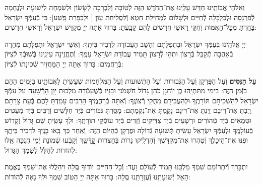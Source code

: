 \documentclass[twoside, openany, parskip=half, 11pt]{book}
\begin{document}
וֵאלֹהֵי אֲבוֹתֵֽינוּ חַדֵּשׁ עָלֵֽינוּ אֶת־הַחֹֽדֶשׁ הַזֶּה לְֿטוֹבָה וְֿלִבְרָכָה לְֿשָׂשׂוֹן וּלְשִׂמְחָה לִישׁוּעָה וּלְנֶחָמָה לְֿפַרְנָסָה וּלְכַלְכָּלָה לְֿחַיִּים וּלְשָׁלוֹם לִמְחִֽילַת חֵטְא וְֿלִסְלִיחַת עָוֹן [
וּלְכַפָּרַת פָּֽשַׁע]: כִּי בְֿעַמְּֿךָ יִשְׂרָאֵל בָּחַֽרְתָּ מִכׇּל־הָאֻמּוֹת וְֿחֻקֵּי רָאשֵׁי חֳדָשִׁים לָהֶם קָבָֽעְֿתָּ: בָּרוּךְ אַתָּה יְיָ מְֿקַדֵּשׁ יִשְׂרָאֵל וְֿרָאשֵׁי חֳדָשִׁים:

\nextpage
{}
יְיָ אֱלֹהֵֽינוּ בְּֿעַמְּֿךָ יִשְׂרָאֵל וּבִתְפִלָּתָם וְֿהָשֵׁב הָעֲבוֹדָה לִדְבִיר בֵּיתֶֽךָ: וְֿאִשֵּׁי יִשְׂרָאֵל וּתְפִלָּתָם מְֿהֵרָה בְּֿאַהֲבָה תְֿקַבֵּל בְּֿרָצוֹן וּתְהִי לְֿרָצוֹן תָּמִיד עֲבוֹדַת יִשְׂרָאֵל עַמֶּֽךָ: וְֿתֶחֱזֶֽינָה עֵינֵֽינוּ בְּֿשׁוּבְֿךָ לְֿצִיּוֹן בְּֿרַחֲמִים: בָּרוּךְ אַתָּה יְיָ הַמַּחֲזִיר שְֿׁכִינָתוֹ לְֿצִיּוֹן:

\modim

\enlargethispage{\baselineskip}

\begin{sometimes}

\textbf{עַל הַנִּסִּים}
וְֿעַל הַפֻּרְקָן וְֿעַל הַגְּֿבוּרוֹת וְֿעַל הַתְּֿשׁוּעוֹת וְֿעַל הַמִּלְחָמוֹת
שֶׁעָשִֽׂיתָ לַאֲבוֹתֵֽינוּ בַּיָּמִים הָהֵם בַּזְּֿמַן הַזֶּה:
בִּימֵי מַתִּתְיָֽהוּ בֶּן יוֹחָנָן כֹּהֵן גָּדוֹל חַשְׁמֹנַי וּבָנָיו כְּֿשֶׁעָמְֿדָה מַלְכוּת יָוָן הָרְֿשָׁעָה עַל עַמְּֿךָ יִשְׂרָאֵל לְֿהַשְׁכִּיחָם תּוֹרָתֶֽךָ וּלְהַעֲבִירָם מֵחֻקֵּי רְֿצוֹנֶֽךָ: וְֿאַתָּה בְּֿרַחֲמֶֽיךָ הָרַבִּים עָמַֽדְתָּ לָהֶם בְּֿעֵת צָרָתָם רַֽבְתָּ אֶת־רִיבָם דַּֽנְתָּ אֶת־דִּינָם נָקַֽמְתָּ אֶת־נִקְמָתָם: מָסַֽרְתָּ גִּבּוֹרִים בְּֿיַד חַלָּשִׁים וְֿרַבִּים בְּֿיַד מְֿעַטִּים וּטְמֵאִים בְּֿיַד טְֿהוֹרִים וּרְשָׁעִים בְּֿיַד צַדִּיקִים וְֿזֵדִים בְּֿיַד עוֹסְֿקֵי תוֹרָתֶֽךָ: וּלְךָ עָשִֽׂיתָ שֵׁם גָּדוֹל וְֿקָדוֹשׁ בְּֿעוֹלָמֶֽךָ וּלְעַמְּֿךָ יִשְׂרָאֵל עָשִֽׂיתָ תְּֿשׁוּעָה גְֿדוֹלָה וּפֻרְקָן כְּֿהַיּוֹם הַזֶּה: וְֿאַֽחַר כַּךְ בָּֽאוּ בָנֶֽיךָ לִדְבִיר בֵּיתֶֽךָ וּפִנּוּ אֶת־הֵיכָלֶֽךָ וְֿטִהֲרוּ אֶת־מִקְדָּשֶֽׁךָ וְֿהִדְלִֽיקוּ נֵרוֹת בְּֿחַצְרוֹת קׇׇׇׇׇׇׇָדְּֿשֶֽׁךָ וְֿקָבְֿעוּ שְֿׁמוֹנַת יְֿמֵי חֲנֻכָּה אֵֽלּוּ לְֿהוֹדוֹת לְֿהַלֵּל לְֿשִׁמְךָ הַגָּדוֹל:

\end{sometimes}

\nextpage

יִתְבָּרַךְ וְֿיִתְרוֹמַם שִׁמְךָ מַלְכֵּֽנוּ תָּמִיד לְֿעוֹלָם וָעֶד:
וְֿכׇל־הַחַיִּים יוֹדֽוּךָ סֶּֽלָה וִיהַלֲלוּ אֶת־שִׁמְךָ בֶּאֱמֶת הָאֵל יְֿשׁוּעָתֵֽנוּ וְֿעֶזְרָתֵֽנוּ סֶֽלָה: בָּרוּךְ אַתָּה יְיָ הַטּוֹב שִׁמְךָ וּלְךָ נָאֶה לְֿהוֹדוֹת:

\end{document}
